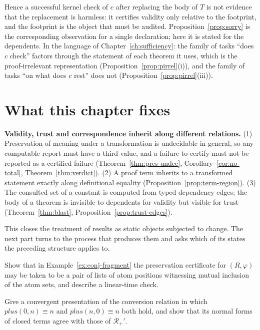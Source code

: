 Hence a successful kernel check of $c$ after replacing the body of $T$ is not evidence that the replacement is harmless: it certifies validity only relative to the footprint, and the footprint is the object that must be audited. Proposition~\ref{prop:sorry} is the corresponding observation for a single declaration; here it is stated for the dependents. In the language of Chapter~\ref{ch:sufficiency}: the family of tasks ``does $c$ check'' factors through the statement of each theorem it uses, which is the proof-irrelevant representation (Proposition~\ref{prop:pirrel}(i)), and the family of tasks ``on what does $c$ rest'' does not (Proposition~\ref{prop:pirrel}(iii)).

\section{What this chapter fixes}

\begin{principal}
\textbf{Validity, trust and correspondence inherit along different relations.} (1) Preservation of meaning under a transformation is undecidable in general, so any computable report must have a third value, and a failure to certify must not be reported as a certified failure (Theorem~\ref{thm:pres-undec}, Corollary~\ref{cor:no-total}, Theorem~\ref{thm:verdict}). (2) A proof term inherits to a transformed statement exactly along definitional equality (Proposition~\ref{prop:term-region}). (3) The consulted set of a constant is computed from typed dependency edges; the body of a theorem is invisible to dependents for validity but visible for trust (Theorem~\ref{thm:blast}, Proposition~\ref{prop:trust-edges}).
\end{principal}

This closes the treatment of results as static objects subjected to change. The next part turns to the process that produces them and asks which of its states the preceding structure applies to.

\begin{exercise}
Show that in Example~\ref{ex:conj-fragment} the preservation certificate for $(R,\varphi)$ may be taken to be a pair of lists of atom positions witnessing mutual inclusion of the atom sets, and describe a linear-time check.
\end{exercise}

\begin{exercise}
Give a convergent presentation of the conversion relation in which $\mathit{plus}(0,n)\equiv n$ and $\mathit{plus}(n,0)\equiv n$ both hold, and show that its normal forms of closed terms agree with those of $\mathcal R_+'$.
\end{exercise}

